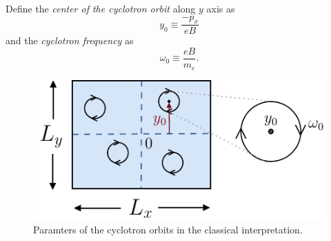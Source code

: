 Define the \textit{center of the cyclotron orbit} along $y$ axis as
\begin{equation} \label{1.11}
  y_0 \equiv \frac{-p_x}{eB}
\end{equation}
and the \textit{cyclotron frequency} as
\begin{equation} \label{1.12}
  \omega_0 \equiv \frac{eB}{m_e}.
\end{equation}
\begin{figure}[ht!]
  \centering
  \includegraphics[scale=0.9]{figures/fig02.pdf}
  \caption{Paramters of the cyclotron orbits in the classical interpretation.}
  \label{fig:1.02}
\end{figure}

